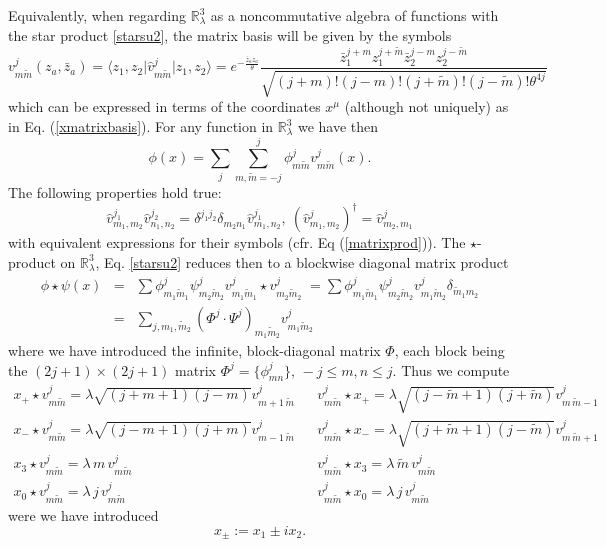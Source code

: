 \documentclass[a4paper,11pt]{article}
\numberwithin{equation}{section}
\newcommand{\eqn}[1]{(\ref{#1})}
\newcommand\Rl{\mathbb{R}^3_\lambda}
\theoremstyle{nonumberplain}
\begin{document}
Equivalently, when regarding     $\Rl$ as a noncommutative algebra of functions with the  star product \eqref{starsu2},   the matrix basis will be  given by the symbols 
\begin{equation}
v^{j}_{m\tilde m}(z_a,\bar z_a)=\langle z_1,z_2\vert\hat v^{j}_{m\tilde m}\vert z_1,z_2 \rangle = e^{-\frac{\bar z_a z_a}{\theta}}\frac{\bar z_1^{j+m}
z_1^{j+\tilde m} \bar z_2^{j-m}
z_2^{j-\tilde m}}{\sqrt{(j+m)!(j-m)! (j+\tilde m)!(j-\tilde m)! \theta^{4j} }} \label{matrixbasis}
\end{equation}
which can be expressed in terms of the coordinates $x^\mu$ (although not uniquely) as in Eq. \eqn{xmatrixbasis}.
For any function in $\Rl$ we have then
 \begin{equation}
\phi(x)=\sum_{j}\sum_{m,\tilde m=-j}^j \phi^j_{m\tilde m} v^j_{m\tilde m}(x).
\label{phixi1}
\end{equation}
The following properties hold true:
\begin{equation}
\hat v^{j_1}_{m_1,m_2}\hat v^{j_2}_{n_1,n_2} =\delta^{j_1j_2}\delta_{m_2n_1}\hat v^{j_1}_{m_1,n_2},\ {{(\hat v^{j}_{m_1,m_2})^\dag}}=\hat v^{j}_{m_2,m_1}
\label{properties2a}
\end{equation}
with equivalent expressions for their symbols (cfr. Eq \eqn{matrixprod}). 
The $\star$-product on $\mathbb{R}_\lambda^3$, Eq. \eqref{starsu2}  reduces  then to a blockwise diagonal matrix product
\begin{eqnarray}
\phi\star \psi (x)&=&\sum \phi^{j}_{m_1\tilde m_1} \psi^{j}_{m_2\tilde m_2}
v^{j}_{m_1\tilde m_1} \star v^{j}_{m_2\tilde m_2} \; =\sum \phi^{j}_{m_1\tilde m_1}
\psi^{j}_{m_2\tilde m_2} v^{j}_{m_1\tilde m_2} \delta_{\tilde m_1 m_2}\nonumber\\
&=& \sum_{j,m_1, \tilde m_2} (\Phi^j\cdot \Psi^j)_{m_1 \tilde m_2} v^j_{m_1 \tilde m_2}
\label{starmatrix1}
\end{eqnarray}
where we have introduced the  infinite, block-diagonal matrix $\Phi$, each block being the $(2j+1)\times (2j+1)$ matrix   $\Phi^j=\{\phi^j_{mn}\}, \, -j\le m,n\le j$.
Thus we compute \cite{vit-wal-12}
\begin{equation} \label{x0v}
\begin{array}{lll}
x_+\star v^j_{m\tilde m}= \lambda \sqrt{(j+m+1)(j-m)} v^j_{m+1 \, \tilde m}  & & v^j_{m\tilde m}\star x_+= \lambda\sqrt{(j-\tilde m+1)(j+\tilde m)} v^j_{m\, \tilde m -1} \\
x_-\star v^j_{m\tilde m}= \lambda \sqrt{(j-m+1)(j+m)} v^j_{m-1\,\tilde m}  &&v^j_{m\tilde m}\star x_-= \lambda\sqrt{(j+\tilde m+1)(j-\tilde m)} v^j_{m \,\tilde m +1} \\
x_3\star v^j_{m\tilde m}= \lambda\, m \, v^j_{m\tilde m}&&  v^j_{m\tilde m} \star x_3= \lambda \,\tilde m \, v^j_{m\tilde m}\\
x_0\star v^j_{m\tilde m}= \lambda\, j \, v^j_{m\tilde m}&&  v^j_{m\tilde m} \star x_0= \lambda\, j \,v^j_{m\tilde m}
\end{array}
 \end{equation}
were we have introduced
\begin{equation}
x_\pm:= x_1\pm i x_2.
\end{equation}
\end{document}

